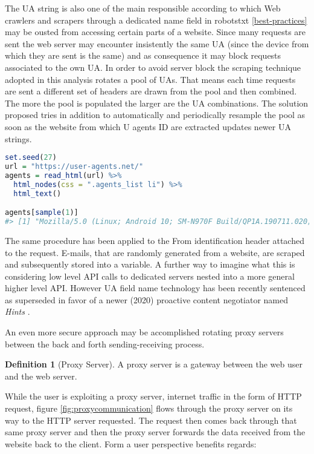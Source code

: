 \documentclass[
  12pt,
  a4paper,
  oneside]{book}
\theoremstyle{definition}
\newtheorem{definition}{Definition}[chapter]
\theoremstyle{definition}
\theoremstyle{definition}
\theoremstyle{remark}
\begin{document}
The UA string is also one of the main responsible according to which Web crawlers and scrapers through a dedicated name field in robotstxt \ref{best-practices} may be ousted from accessing certain parts of a website. Since many requests are sent the web server may encounter insistently the same UA (since the device from which they are sent is the same) and as consequence it may block requests associated to the own UA. In order to avoid server block the scraping technique adopted in this analysis rotates a pool of UAs. That means each time requests are sent a different set of headers are drawn from the pool and then combined. The more the pool is populated the larger are the UA combinations. The solution proposed tries in addition to automatically and periodically resample the pool as soon as the website from which U agents ID are extracted updates newer UA strings.

\begin{lstlisting}[language=R]
set.seed(27)
url = "https://user-agents.net/"
agents = read_html(url) %>%
  html_nodes(css = ".agents_list li") %>% 
  html_text()

agents[sample(1)]
#> [1] "Mozilla/5.0 (Linux; Android 10; SM-N970F Build/QP1A.190711.020; wv) AppleWebKit/537.36 (KHTML, like Gecko) Version/4.0 Chrome/89.0.4389.105 Mobile Safari/537.36 [FB_IAB/FB4A;FBAV/314.1.0.45.119;]"
\end{lstlisting}

The same procedure has been applied to the From identification header attached to the request. E-mails, that are randomly generated from a website, are scraped and subsequently stored into a variable. A further way to imagine what this is considering low level API calls to dedicated servers nested into a more general higher level API.
However UA field name technology has been recently sentenced as superseded in favor of a newer (2020) proactive content negotiator named \emph{Hints} \citet{wiki:UserAgentHints}.

An even more secure approach may be accomplished rotating proxy servers between the back and forth sending-receiving process.
\begin{definition}[Proxy Server]
\protect\hypertarget{def:proxy}{}{\label{def:proxy} \iffalse (Proxy Server) \fi{} }A proxy server is a gateway between the web user and the web server.
\end{definition}
While the user is exploiting a proxy server, internet traffic in the form of HTTP request, figure \ref{fig:proxycommunication} flows through the proxy server on its way to the HTTP server requested. The request then comes back through that same proxy server and then the proxy server forwards the data received from the website back to the client.
Form a user perspective benefits regards:
\end{document}

